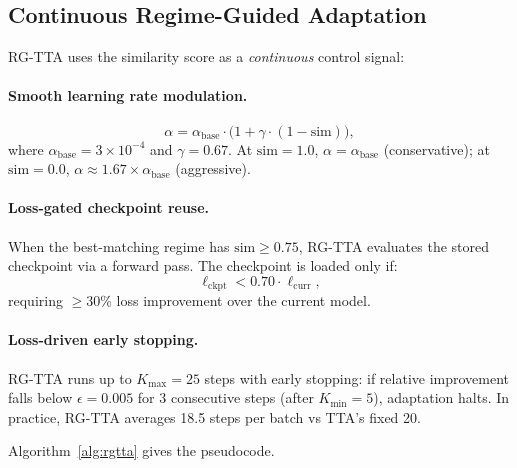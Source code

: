 \documentclass[journal]{IEEEtran}
\begin{document}
\subsection{Continuous Regime-Guided Adaptation}
\label{sec:adaptation}

RG-TTA uses the similarity score as a \emph{continuous} control signal:

\paragraph{Smooth learning rate modulation.}
\begin{equation}
  \alpha = \alpha_{\text{base}} \cdot \big(1 + \gamma \cdot (1 - \text{sim})\big),
  \label{eq:lr}
\end{equation}
where $\alpha_{\text{base}} = 3 \times 10^{-4}$ and $\gamma = 0.67$. At $\text{sim} = 1.0$, $\alpha = \alpha_{\text{base}}$ (conservative); at $\text{sim} = 0.0$, $\alpha \approx 1.67 \times \alpha_{\text{base}}$ (aggressive).

\paragraph{Loss-gated checkpoint reuse.} When the best-matching regime has $\text{sim} \geq 0.75$, RG-TTA evaluates the stored checkpoint via a forward pass. The checkpoint is loaded only if:
\begin{equation}
  \ell_{\text{ckpt}} < 0.70 \cdot \ell_{\text{curr}},
  \label{eq:gate}
\end{equation}
requiring $\geq$30\% loss improvement over the current model.

\paragraph{Loss-driven early stopping.} RG-TTA runs up to $K_{\max} = 25$ steps with early stopping: if relative improvement falls below $\epsilon = 0.005$ for 3 consecutive steps (after $K_{\min} = 5$), adaptation halts. In practice, RG-TTA averages 18.5 steps per batch vs TTA's fixed 20.

Algorithm~\ref{alg:rgtta} gives the pseudocode.
\end{document}
